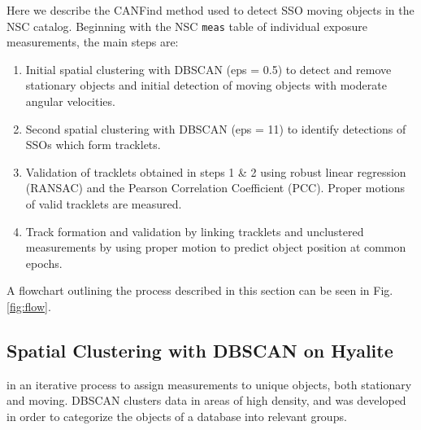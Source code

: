 \documentclass[twocolumn]{aastex62}
\begin{document}
Here we describe the CANFind method used to detect SSO moving objects in the NSC catalog.    Beginning with the NSC \texttt{meas} table of individual exposure measurements, the main steps are:
\begin{enumerate}
    \item Initial spatial clustering with DBSCAN (eps = 0.5\arcsec) to detect and remove stationary objects and initial detection of moving objects with moderate angular velocities.
    \item Second spatial clustering with DBSCAN (eps = 11\arcsec) to identify detections of SSOs which form tracklets.
    \item Validation of tracklets obtained in steps 1 \& 2 using robust linear regression (RANSAC) and the Pearson Correlation Coefficient (PCC).  Proper motions of valid tracklets are measured.
    \item Track formation and validation by linking tracklets and unclustered measurements by using proper motion to predict object position at common epochs.
\end{enumerate}

A flowchart outlining the process described in this section can be seen in Fig. \ref{fig:flow}.

\subsection{Spatial Clustering with DBSCAN on Hyalite}
\label{ssec:dbscan}
  in an iterative process to assign measurements to unique objects, both stationary and moving.  DBSCAN clusters data in areas of high density, and was developed in order to categorize the objects of a database into relevant groups. 
\end{document}
